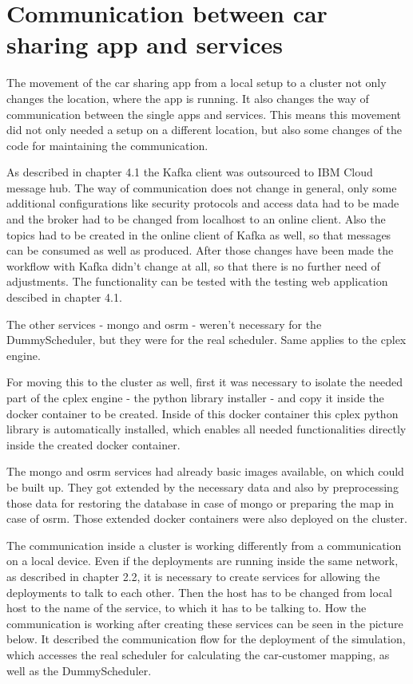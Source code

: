 \section{Communication between car sharing app and services}

The movement of the car sharing app from a local setup to a cluster not only changes the location, where the app is running. It also changes the way of communication between the single apps and services. This means this movement did not only needed a setup on a different location, but also some changes of the code for maintaining the communication. 

As described in chapter 4.1 the Kafka client was outsourced to IBM Cloud message hub. The way of communication does not change in general, only some additional configurations like security protocols and access data had to be made and the broker had to be changed from localhost to an online client. Also the topics had to be created in the online client of Kafka as well, so that messages can be consumed as well as produced. After those changes have been made the workflow with Kafka didn't change at all, so that there is no further need of adjustments. The functionality can be tested with the testing web application descibed in chapter 4.1.

The other services - mongo and osrm - weren't necessary for the DummyScheduler, but they were for the real scheduler. Same applies to the cplex engine.

For moving this to the cluster as well, first it was necessary to isolate the needed part of the cplex engine - the python library installer - and copy it inside the docker container to be created. Inside of this docker container this cplex python library is automatically installed, which enables all needed functionalities directly inside the created docker container.

The mongo and osrm services had already basic images available, on which could be built up. They got extended by the necessary data and also by preprocessing those data for restoring the database in case of mongo or preparing the map in case of osrm. Those extended docker containers were also deployed on the cluster.

The communication inside a cluster is working differently from a communication on a local device. Even if the deployments are running inside the same network, as described in chapter 2.2, it is necessary to create services for allowing the deployments to talk to each other. Then the host has to be changed from local host to the name of the service, to which it has to be talking to. How the communication is working after creating these services can be seen in the picture below. It described the communication flow for the deployment of the simulation, which accesses the real scheduler for calculating the car-customer mapping, as well as the DummyScheduler.

